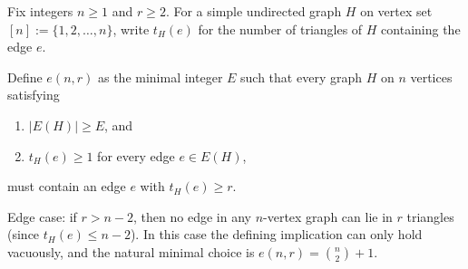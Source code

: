 \par
Fix integers $n\ge 1$ and $r\ge 2$.
For a simple undirected graph $H$ on vertex set $[n]:=\{1,2,\dots,n\}$, write $t_H(e)$ for the number of triangles of $H$ containing the edge $e$.

Define $e(n,r)$ as the minimal integer $E$ such that every graph $H$ on $n$ vertices satisfying
\begin{enumerate}
\item $|E(H)|\ge E$, and
\item $t_H(e)\ge 1$ for every edge $e\in E(H)$,
\end{enumerate}
must contain an edge $e$ with $t_H(e)\ge r$.

Edge case: if $r>n-2$, then no edge in any $n$-vertex graph can lie in $r$ triangles (since $t_H(e)\le n-2$). In this case the defining implication can only hold vacuously, and the natural minimal choice is $e(n,r)={n\choose 2}+1$.
